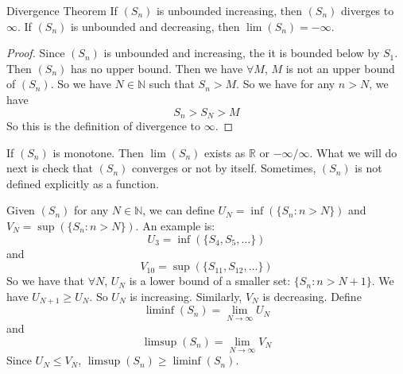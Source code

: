 \documentclass{report}
\begin{document}
\begin{theorem}{Divergence Theorem}
    If $(S_{n})$ is unbounded increasing, then $(S_{n})$ diverges to $\infty$. If $(S_{n})$ is unbounded and decreasing, then $\lim (S_{n}) = -\infty$.
\end{theorem}
    \begin{proof}
        Since $(S_{n})$ is unbounded and increasing, the it is bounded below by $S_{1}$. Then $(S_{n})$ has no upper bound. Then we have $\forall M$, $M$ is not an upper bound of $(S_{n})$. So we have $N \in \mathbb{N}$ such that $S_{n} > M$. So we have for any $n > N$, we have
            \begin{equation*}
                S_{n} > S_{N} > M
            \end{equation*}
        So this is the definition of divergence to $\infty$.
    \end{proof}

If $(S_{n})$ is monotone. Then $\lim (S_{n})$ exists as $\mathbb{R}$ or $-\infty/\infty$. What we will do next is check that $(S_{n})$ converges or not by itself. Sometimes, $(S_{n})$ is not defined explicitly as a function.

Given $(S_{n})$ for any $N \in \mathbb{N}$, we can define $U_{N} = \inf (\{S_{n}: n > N\})$ and $V_{N} = \sup (\{S_{n} : n > N\})$. An example is:
    \begin{equation*}
        U_{3} = \inf (\{S_{4}, S_{5}, \ldots\})
    \end{equation*}
and
    \begin{equation*}
        V_{10} = \sup (\{S_{11}, S_{12}, \ldots\})
    \end{equation*}
So we have that $\forall N$, $U_{N}$ is a lower bound of a smaller set: $\{S_{n} : n > N + 1\}$. We have $U_{N + 1} \geq U_{N}$. So $U_{N}$ is increasing. Similarly, $V_{N}$ is decreasing. Define 
    \begin{equation*}
        \liminf (S_{n}) = \lim _{N \rightarrow \infty} U_{N}
    \end{equation*}
and
    \begin{equation*}
        \limsup (S_{n}) = \lim _{N \rightarrow \infty} V_{N}
    \end{equation*}
Since $U_{N} \leq V_{N}$, $\limsup (S_{n}) \geq \liminf (S_{n})$.
\end{document}

